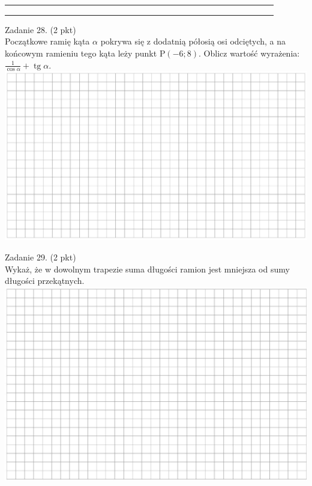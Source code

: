 \documentclass[10pt]{article}
\begin{document}
\begin{center}
\begin{tabular}{|c|c|c|c|c|c|c|c|c|c|c|c|c|c|c|c|c|c|c|c|c|c|c|c|c|c|c|c|c|c|c|c|}
\hline
 &  &  &  &  &  &  &  &  &  &  &  &  &  &  &  &  &  &  &  &  &  &  &  &  &  &  &  &  &  &  &  \\
\hline
 &  &  &  &  &  &  &  &  &  &  &  &  &  &  &  &  &  &  &  &  &  &  &  &  &  &  &  &  &  &  &  \\
\hline
 &  &  &  &  &  &  &  &  &  &  &  &  &  &  &  &  &  &  &  &  &  &  &  &  &  &  &  &  &  &  &  \\
\hline
 &  &  &  &  &  &  &  &  &  &  &  &  &  &  &  &  &  &  &  &  &  &  &  &  &  &  &  &  &  &  &  \\
\hline
\end{tabular}
\end{center}

Zadanie 28. (2 pkt)\\
Początkowe ramię kąta \(\alpha\) pokrywa się z dodatnią półosią osi odciętych, a na końcowym ramieniu tego kąta leży punkt \(\mathrm{P}(-6 ; 8)\). Oblicz wartość wyrażenia: \(\frac{1}{\cos \alpha}+\operatorname{tg} \alpha\).\\
\includegraphics[max width=\textwidth, center]{2024_11_21_a68a2ba4fc31c5fb438eg-09}

Zadanie 29. (2 pkt)\\
Wykaż, że w dowolnym trapezie suma długości ramion jest mniejsza od sumy długości przekątnych.\\
\includegraphics[max width=\textwidth, center]{2024_11_21_a68a2ba4fc31c5fb438eg-09(1)}
\end{document}
